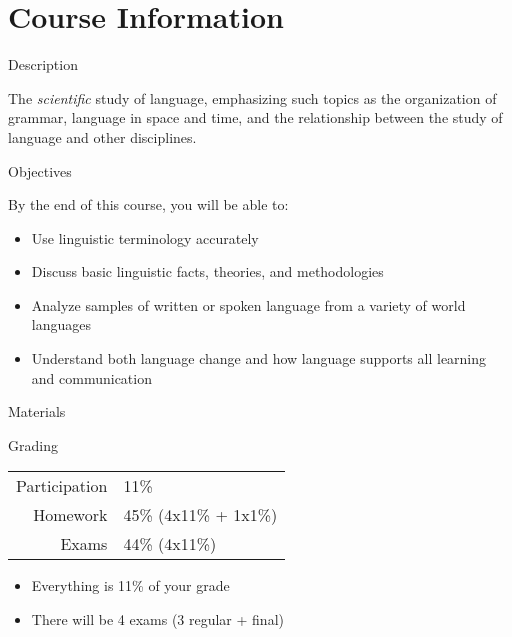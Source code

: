 \documentclass{beamer}
\subtitle[Welcome]{Welcome}
\begin{document}
  

  \section{Course Information}
    \begin{frame}{Description}
      \begin{block}{}
        The \emph{scientific} study of language, emphasizing such topics as the organization of grammar, language in space and time, and the relationship between the study of language and other disciplines.
      \end{block}
    \end{frame}

    \begin{frame}{Objectives}
      \begin{block}{}
        By the end of this course, you will be able to:
        \begin{itemize}
          \item Use linguistic terminology accurately
          \item Discuss basic linguistic facts, theories, and methodologies
          \item Analyze samples of written or spoken language from a variety of world languages
          \item Understand both language change and how language supports all learning and communication
        \end{itemize}
      \end{block}
    \end{frame}

    \begin{frame}{Materials}
      \begin{block}{}
      \end{block}
    \end{frame}

    \begin{frame}{Grading}
      \begin{block}{}
        \begin{tabular}{r l}
          Participation & 11\%\\
          Homework      & 45\% (4x11\% + 1x1\%)\\
          Exams         & 44\% (4x11\%)
        \end{tabular}
      \end{block}
      \begin{block}{}
        \begin{itemize}
          \item Everything is 11\% of your grade
          \item There will be 4 exams (3 regular + final)
        \end{itemize}
      \end{block}
    \end{frame}
\end{document}
